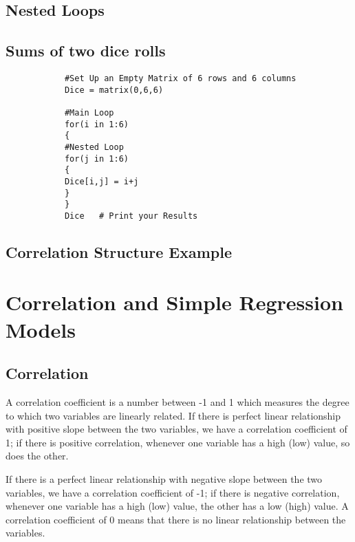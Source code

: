\documentclass[a4paper,12pt]{article}
\begin{document}
\begin{itemize}
\begin{itemize}
\begin{framed}
\begin{verbatim}
			\end{verbatim}
		\end{framed}
		
		
		\subsection{Nested Loops}
		
		\subsection{Sums of two dice rolls}
		\begin{framed}
			\begin{verbatim}
			#Set Up an Empty Matrix of 6 rows and 6 columns
			Dice = matrix(0,6,6)
			
			#Main Loop
			for(i in 1:6)
			{
			#Nested Loop
			for(j in 1:6)
			{
			Dice[i,j] = i+j
			}
			}		
			Dice   # Print your Results
			\end{verbatim}
		\end{framed}
		\subsection{Correlation Structure Example}
		
		
		\newpage
		\section{Correlation and Simple Regression Models}
		
		\subsection{Correlation}
		
		A correlation coefficient is a number between -1 and 1 which measures the degree to which two variables are linearly related. If there is perfect linear relationship with positive slope between the two variables, we have a correlation coefficient of 1; if there is positive correlation, whenever one variable has a high (low) value, so does the other.
		
		If there is a perfect linear relationship with negative slope between the two variables, we have a correlation coefficient of -1; if there is negative correlation, whenever one variable has a high (low) value, the other has a low (high) value.
		A correlation coefficient of 0 means that there is no linear relationship between the variables.
		

\end{itemize}
\end{itemize}
\end{document}
